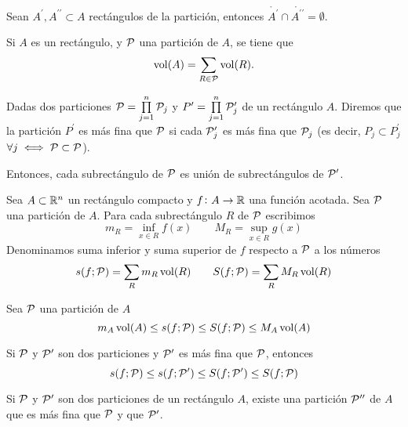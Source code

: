 \begin{obs}
    Sean $A^\prime,A^{\prime\prime}\subset A$ rectángulos de la partición, entonces
    $\mathring{A^\prime} \cap \mathring{A^{\prime\prime}} = \emptyset$.
\end{obs}

\begin{lema}
    Si $A$ es un rectángulo, y $\mathcal{P}$ una partición de $A$, se tiene que
    \[
        \operatorname{vol}(A) = \sum_{R \in \mathcal{P}} \operatorname{vol}(R).
    \]
\end{lema}

\begin{defi}
    Dadas dos particiones $\mathcal{P} = \prod\limits^n_{j=1} \mathcal{P}_j$ y
    $P^\prime = \prod\limits^n_{j=1} \mathcal{P}^\prime_j$ de un rectángulo $A$. Diremos
    que la partición $P^\prime$ es más fina que $\mathcal{P}$ si cada $\mathcal{P}^\prime_j$ es más
    fina que $\mathcal{P}_j$ (es decir, $P_j \subset P^\prime_j$ $\forall j \iff \mathcal{P}
    \subset \mathcal{P}$).

    Entonces, cada subrectángulo de $\mathcal{P}$ es unión de subrectángulos de
    $\mathcal{P}^\prime$.
\end{defi}

\begin{defi}
    Sea $A \subset \mathbb{R}^n$ un rectángulo compacto y $f \colon A \to \mathbb{R}$ una
    función acotada. Sea $\mathcal{P}$ una partición de $A$. Para cada subrectángulo $R$
    de $\mathcal{P}$ escribimos
    \[
        m_R = \inf_{x \in R} f(x) \qquad M_R = \sup_{x \in R} g(x)
    \]
    Denominamos suma inferior y suma superior de $f$ respecto a $\mathcal{P}$ a los números
    \[
        s(f;\mathcal{P}) = \sum_R m_R\operatorname{vol}(R) \qquad S(f;\mathcal{P}) = \sum_R M_R\operatorname{vol}(R)
    \]
\end{defi}

\begin{obs}
    Sea $\mathcal{P}$ una partición de $A$
    \[
        m_A\operatorname{vol}(A) \leq s(f;\mathcal{P}) \leq S(f;\mathcal{P}) \leq M_A\operatorname{vol}(A)
    \]
\end{obs}
\begin{obs}
    Si $\mathcal{P}$ y $\mathcal{P}^\prime$ son dos particiones y $\mathcal{P}^\prime$ es más fina que
    $\mathcal{P}$, entonces
    \[
        s(f;\mathcal{P}) \leq s(f;\mathcal{P}^\prime) \leq S(f;\mathcal{P}^\prime) \leq S(f;\mathcal{P})
    \]
\end{obs}

\begin{lema}
    Si $\mathcal{P}$ y $\mathcal{P}^\prime$ son dos particiones de un rectángulo $A$, existe una
    partición $\mathcal{P}^{\prime\prime}$ de $A$ que es más fina que $\mathcal{P}$ y que
    $\mathcal{P}^\prime$.
\end{lema}

